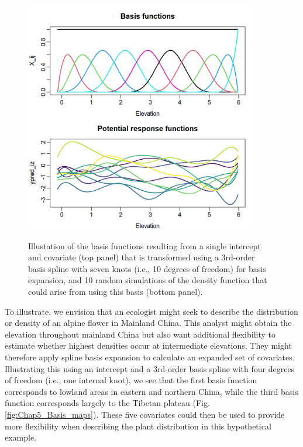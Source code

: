 \begin{figure}[!ht]
    \caption[Basis functions using cubic splines]{Illustation of the basis functions resulting from a single intercept and covariate (top panel) that is transformed using a 3rd-order basis-spline with seven knots (i.e., 10 degrees of freedom) for basis expansion, and 10 random simulations of the density function that could arise from using this basis (bottom panel).}
    \centering
    \includegraphics[width=4in]{Chap_5/Basis-bs.png}
    \label{fig:Chap5_Basis_bs}
\end{figure}

To illustrate, we envision that an ecologist might seek to describe the distribution or density of an alpine flower in Mainland China.  This analyst might obtain the elevation throughout mainland China but also want additional flexibility to estimate whether highest densities occur at intermediate elevations.  They might therefore apply spline basis expansion to calculate an expanded set of covariates.  Illustrating this using an intercept and a 3rd-order basis spline with four degrees of freedom (i.e., one internal knot), we see that the first basis function corresponds to lowland areas in eastern and northern China, while the third basis function corresponds largely to the Tibetan plateau (Fig. \ref{fig:Chap5_Basis_maps}).  These five covariates could then be used to provide more flexibility when describing the plant distribution in this hypothetical example.  


